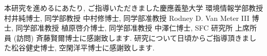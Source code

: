 \begin{acknowledgment}

本研究を進めるにあたり, ご指導いただきました慶應義塾大学 環境情報学部教授 村井純博士, 
同学部教授 中村修博士, 同学部准教授 Rodney D. Van Meter III 博士, 同学部准教授 植原啓介博士, 
同学部准教授 中澤仁博士, SFC 研究所 上席所員 (訪問) 斉藤賢爾博士に感謝致します.
研究について日頃からご指導頂きました松谷健史博士, 空閑洋平博士に感謝致します.

\end{acknowledgment}
